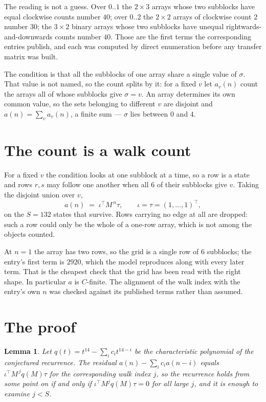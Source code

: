 \documentclass[11pt,a4paper]{article}
\theoremstyle{plain}
\newtheorem{lemma}[theorem]{Lemma}
\theoremstyle{definition}
\begin{document}
The reading is not a guess. Over $0..1$ the $2\times3$ arrays whose two subblocks have equal
clockwise counts number $40$; over $0..2$ the $2\times2$ arrays of clockwise count $2$ number
$30$; the $3\times2$ binary arrays whose two subblocks have unequal rightwards-and-downwards
counts number $40$. Those are the first terms the corresponding entries publish, and each was
computed by direct enumeration before any transfer matrix was built.

The condition is that all the subblocks of one array share a single value of $\sigma$. That
value is not named, so the count splits by it: for a fixed $v$ let $a_v(n)$ count the arrays all
of whose subblocks give $\sigma=v$. An array determines its own common value, so the sets
belonging to different $v$ are disjoint and $a(n)=\sum_v a_v(n)$, a finite sum --- $\sigma$
lies between $0$ and $4$.

\section{The count is a walk count}

For a fixed $v$ the condition looks at one subblock at a time, so a row is
a state and rows $r,s$ may follow one another when all $6$ of their subblocks give $v$.
Taking the disjoint union over $v$,
\[
a(n)\;=\;\iota^{\!\top}M^{\,n}\tau,\qquad\iota=\tau=(1,\dots,1)^{\!\top},
\]
on the $S=132$ states that survive. Rows carrying no edge at all are dropped: such a row could
only be the whole of a one-row array, which is not among the objects counted.

At $n=1$ the array has two rows, so the grid is a single row of $6$
subblocks; the entry's first term is $2920$, which the model
reproduces along with every later term. That is the cheapest check that the grid has been read
with the right shape.
In particular $a$ is $C$-finite. The alignment of the walk index with the entry's own $n$ was
checked against its published terms rather than assumed.

\section{The proof}

\begin{lemma}\label{lem:crit}
Let $q(t)=t^{14}-\sum_i c_it^{14-i}$ be the characteristic polynomial of the
conjectured recurrence. The residual $a(n)-\sum_ic_ia(n-i)$ equals
$\iota^{\!\top}M^{\,j}q(M)\tau$ for the corresponding walk index $j$, so the recurrence
holds from some point on if and only if $\iota^{\!\top}M^{j}q(M)\tau=0$ for all large $j$,
and it is enough to examine $j<S$.
\end{lemma}
\end{document}
